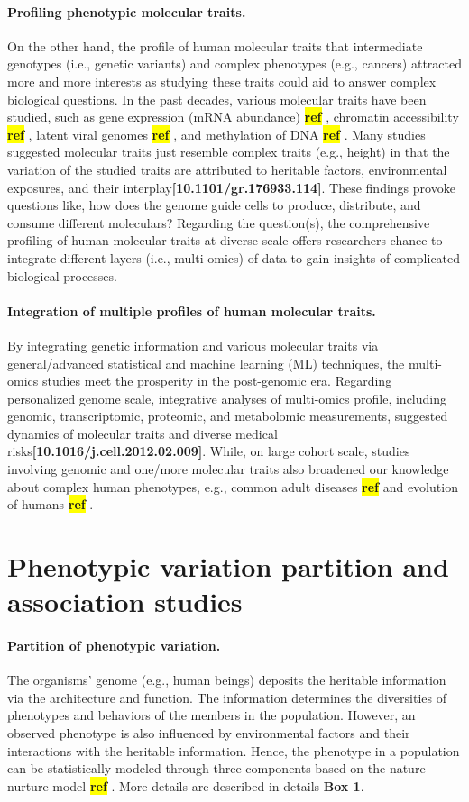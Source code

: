 \documentclass[12pt,usletter, fancy]{elegantbook}
\newcommand{\reqref}[1][ref]{
  \colorbox{yellow}{\textbf{#1}}
}
\begin{document}
\paragraph*{Profiling phenotypic molecular traits.}
On the other hand, the profile of human molecular traits that intermediate genotypes (i.e., genetic variants) and complex phenotypes (e.g., cancers) attracted more and more interests as studying these traits could aid to answer complex biological questions.
In the past decades, various molecular traits have been studied, such as gene expression (mRNA abundance)\reqref, chromatin accessibility\reqref, latent viral genomes\reqref, and methylation of DNA\reqref.
Many studies suggested molecular traits just resemble complex traits (e.g., height) in that the variation of the studied traits are attributed to heritable factors, environmental exposures, and their interplay\textbf{[10.1101/gr.176933.114]}.
These findings provoke questions like, how does the genome guide cells to produce, distribute, and consume different moleculars?
Regarding the question(s), the comprehensive profiling of human molecular traits at diverse scale offers researchers chance to integrate different layers (i.e., multi-omics) of data to gain insights of complicated biological processes.

\paragraph*{Integration of multiple profiles of human molecular traits.}
By integrating genetic information and various molecular traits via general/advanced statistical and machine learning (ML) techniques, the multi-omics studies meet the prosperity in the post-genomic era.
Regarding personalized genome scale, integrative analyses of multi-omics profile, including genomic, transcriptomic, proteomic, and metabolomic measurements, suggested dynamics of molecular traits and diverse medical risks\textbf{[10.1016/j.cell.2012.02.009]}.
While, on large cohort scale, studies involving genomic and one/more molecular traits also broadened our knowledge about complex human phenotypes, e.g., common adult diseases\reqref and evolution of humans\reqref.


\section*{Phenotypic variation partition and association studies}
\paragraph*{Partition of phenotypic variation.}
The organisms' genome (e.g., human beings) deposits the heritable information via the architecture and function.
The information determines the diversities of phenotypes and behaviors of the members in the population.
However, an observed phenotype is also influenced by environmental factors and their interactions with the heritable information.
Hence, the phenotype in a population can be statistically modeled through three components  based on the nature-nurture model\reqref.
More details are described in details \textbf{Box 1}.
\end{document}
